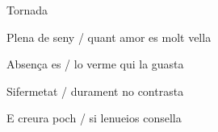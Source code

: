 \documentclass[12pt]{article}
\begin{document}
\begin{estrofa}%




\begin{tornada}

\clauOberta Tornada \clauTancada

\end{tornada}


\end{estrofa}


\begin{estrofa}

 Plena de seny / quant amor es molt vella

 Absen\c{c}a es / lo verme qui la guasta

 Sifermetat / durament no contrasta

 E creura poch / si lenueios consella

\end{estrofa}
\end{document}
